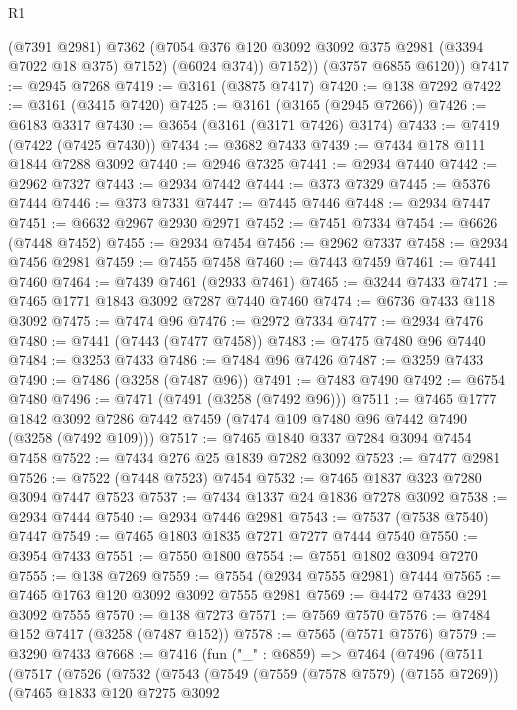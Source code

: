 \begin{lexlean}{R1}
\begin{coremodule}
            (@7391 @2981)
            @7362
            (@7054 @376 @120 @3092 @3092 @375 @2981 (@3394 @7022 @18 @375) @7152)
            (@6024 @374))
          @7152))
      (@3757 @6855 @6120))
@7417 := @2945 @7268
@7419 := @3161 (@3875 @7417)
@7420 := @138 @7292
@7422 := @3161 (@3415 @7420)
@7425 := @3161 (@3165 (@2945 @7266))
@7426 := @6183 @3317
@7430 := @3654 (@3161 (@3171 @7426) @3174)
@7433 := @7419 (@7422 (@7425 @7430))
@7434 := @3682 @7433
@7439 := @7434 @178 @111 @1844 @7288 @3092
@7440 := @2946 @7325
@7441 := @2934 @7440
@7442 := @2962 @7327
@7443 := @2934 @7442
@7444 := @373 @7329
@7445 := @5376 @7444
@7446 := @373 @7331
@7447 := @7445 @7446
@7448 := @2934 @7447
@7451 := @6632 @2967 @2930 @2971
@7452 := @7451 @7334
@7454 := @6626 (@7448 @7452)
@7455 := @2934 @7454
@7456 := @2962 @7337
@7458 := @2934 @7456 @2981
@7459 := @7455 @7458
@7460 := @7443 @7459
@7461 := @7441 @7460
@7464 := @7439 @7461 (@2933 @7461)
@7465 := @3244 @7433
@7471 := @7465 @1771 @1843 @3092 @7287 @7440 @7460
@7474 := @6736 @7433 @118 @3092
@7475 := @7474 @96
@7476 := @2972 @7334
@7477 := @2934 @7476
@7480 := @7441 (@7443 (@7477 @7458))
@7483 := @7475 @7480 @96 @7440
@7484 := @3253 @7433
@7486 := @7484 @96 @7426
@7487 := @3259 @7433
@7490 := @7486 (@3258 (@7487 @96))
@7491 := @7483 @7490
@7492 := @6754 @7480
@7496 := @7471 (@7491 (@3258 (@7492 @96)))
@7511 := @7465
    @1777
    @1842
    @3092
    @7286
    @7442
    @7459
    (@7474 @109 @7480 @96 @7442 @7490 (@3258 (@7492 @109)))
@7517 := @7465 @1840 @337 @7284 @3094 @7454 @7458
@7522 := @7434 @276 @25 @1839 @7282 @3092
@7523 := @7477 @2981
@7526 := @7522 (@7448 @7523) @7454
@7532 := @7465 @1837 @323 @7280 @3094 @7447 @7523
@7537 := @7434 @1337 @24 @1836 @7278 @3092
@7538 := @2934 @7444
@7540 := @2934 @7446 @2981
@7543 := @7537 (@7538 @7540) @7447
@7549 := @7465 @1803 @1835 @7271 @7277 @7444 @7540
@7550 := @3954 @7433
@7551 := @7550 @1800
@7554 := @7551 @1802 @3094 @7270
@7555 := @138 @7269
@7559 := @7554 (@2934 @7555 @2981) @7444
@7565 := @7465 @1763 @120 @3092 @3092 @7555 @2981
@7569 := @4472 @7433 @291 @3092 @7555
@7570 := @138 @7273
@7571 := @7569 @7570
@7576 := @7484 @152 @7417 (@3258 (@7487 @152))
@7578 := @7565 (@7571 @7576)
@7579 := @3290 @7433
@7668 := @7416
    (fun ("_" : @6859) =>
    @7464
      (@7496
        (@7511
          (@7517
            (@7526
              (@7532
                (@7543
                  (@7549
                    (@7559 (@7578 @7579) (@7155 @7269))
                    (@7465
                      @1833
                      @120
                      @7275
                      @3092

\end{coremodule}
\end{lexlean}
